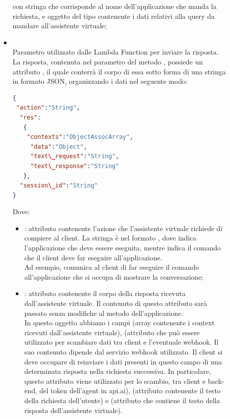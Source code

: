 \begin{itemize}
\begin{itemize}
\begin{itemize}
con  stringa che corrisponde al nome dell'applicazione che manda la richiesta, e  oggetto del tipo  contenente i dati relativi alla query da mandare all'assistente virtuale;
			\item {} \\
			Parametro utilizzato dalle Lambda Function per inviare la risposta. La risposta, contenuta nel  parametro del metodo , possiede un attributo , il quale conterrà il corpo di essa sotto forma di una stringa in formato JSON, organizzando i dati nel seguente modo:
 \begin{lstlisting}[language=json,firstnumber=1]
{
 "action":"String",
  "res":
   {
    "contexts":"ObjectAssocArray",
     "data":"Object",
     "text\_request":"String",
     "text\_response":"String"
   },
  "session\_id":"String"
}
\end{lstlisting}
Dove:
\begin{itemize}
   \item {}: attributo contenente l'azione che l'assistente virtuale richiede di compiere al client. La stringa è nel formato , dove  indica l'applicazione che deve essere   eseguita, mentre  indica il comando che il client deve far eseguire all'applicazione. \\ Ad esempio,  comunica al client di far eseguire il comando  all'applicazione che si occupa di mostrare la conversazione;
   \item {}: attributo contenente il corpo della risposta ricevuta dall'assistente virtuale. Il contenuto di questo attributo sarà passato senza modifiche al metodo  dell'applicazione.\\ In questo oggetto abbiamo i campi  (array contenente i context ricevuti dall'assistente virtuale),  (attributo che può essere utilizzato per scambiare dati tra client e l'eventuale webhook. Il suo contenuto dipende dal servizio webhook utilizzato. Il client si deve occupare di reinviare i dati presenti in questo campo  di una determinata risposta nella richiesta successiva. In particolare, questo attributo viene utilizzato per lo scambio, tra client e back-end, del token dell'agent in api.ai),  (attributo contenente il testo della richiesta dell'utente) e (attributo che contiene il testo della risposta dell'assistente virtuale).

\end{itemize}
\end{itemize}
\end{itemize}
\end{itemize}
